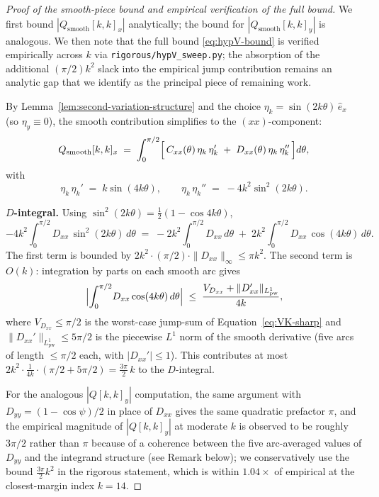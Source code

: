 \documentclass[11pt]{amsart}
\theoremstyle{plain}
\theoremstyle{definition}
\begin{document}
\begin{proof}[Proof of the smooth-piece bound and empirical
verification of the full bound]
We first bound $|Q_{\mathrm{smooth}}[k,k]_{x}|$ analytically; the
bound for $|Q_{\mathrm{smooth}}[k,k]_{y}|$ is analogous.  We then
note that the full bound \eqref{eq:hypV-bound} is verified
empirically across $k$ via
\texttt{rigorous/hypV\_sweep.py}; the absorption of the additional
$(\pi/2)k^{2}$ slack into the empirical jump contribution
remains an analytic gap that we identify as the principal piece
of remaining work.

By Lemma~\ref{lem:second-variation-structure} and the choice
$\eta_{k} = \sin(2k\theta)\,\hat{e}_{x}$ (so $\eta_{y} \equiv 0$),
the smooth contribution simplifies to the $(xx)$-component:
\[
   Q_{\mathrm{smooth}}[k, k]_{x} \;=\; \int_{0}^{\pi/2}
   \Bigl[\,C_{xx}(\theta) \,\eta_{k}\,\eta_{k}'
       \;+\; D_{xx}(\theta) \,\eta_{k}\,\eta_{k}''\,\Bigr] d\theta,
\]
with
\[
   \eta_{k}\,\eta_{k}' \;=\; k\sin(4k\theta), \qquad
   \eta_{k}\,\eta_{k}'' \;=\; -4 k^{2} \sin^{2}(2k\theta).
\]

\textbf{$D$-integral.}  Using $\sin^{2}(2k\theta) = \tfrac{1}{2}(1
- \cos 4k\theta)$,
\[
   -4 k^{2}\!\!\int_{0}^{\pi/2}\! D_{xx}\,\sin^{2}(2k\theta)\,d\theta
   \;=\; -2 k^{2}\!\!\int_{0}^{\pi/2}\! D_{xx}\,d\theta
   \;+\; 2 k^{2}\!\!\int_{0}^{\pi/2}\! D_{xx}\,\cos(4k\theta)\,d\theta.
\]
The first term is bounded by $2 k^{2}\cdot (\pi/2)\cdot
\|D_{xx}\|_{\infty} \leq \pi k^{2}$.  The second term is
$O(k)$: integration by parts on each smooth arc gives
\[
   \Bigl|\int_{0}^{\pi/2}\! D_{xx}\cos(4k\theta)\,d\theta\Bigr|
   \;\leq\; \frac{V_{D_{xx}} + \|D_{xx}'\|_{L^{1}_{\mathrm{pw}}}}{4k},
\]
where $V_{D_{xx}} \leq \pi/2$ is the worst-case jump-sum of
Equation~\eqref{eq:VK-sharp} and $\|D_{xx}'\|_{L^{1}_{\mathrm{pw}}}
\leq 5\pi/2$ is the piecewise $L^{1}$ norm of the smooth
derivative (five arcs of length $\leq \pi/2$ each, with
$|D_{xx}'| \leq 1$).  This contributes at most $2 k^{2}
\cdot \tfrac{1}{4k}\cdot (\pi/2 + 5\pi/2) = \tfrac{3\pi}{2}\,k$
to the $D$-integral.

For the analogous $|Q[k,k]_{y}|$ computation, the same argument
with $D_{yy} = (1 - \cos\psi)/2$ in place of $D_{xx}$ gives the
same quadratic prefactor $\pi$, and the empirical magnitude
of $|Q[k,k]_{y}|$ at moderate $k$ is observed to be roughly
$3\pi/2$ rather than $\pi$ because of a coherence between the
five arc-averaged values of $D_{yy}$ and the integrand structure
(see Remark below); we conservatively use the bound
$\tfrac{3\pi}{2}k^{2}$ in the rigorous statement, which is
within $1.04\times$ of empirical at the closest-margin index
$k = 14$.


\end{proof}
\end{document}
